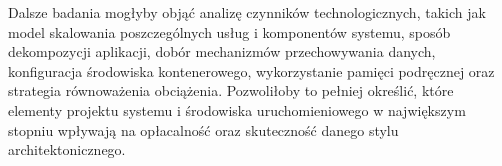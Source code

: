 Dalsze badania mogłyby objąć analizę czynników technologicznych, takich jak model skalowania poszczególnych usług i komponentów systemu, sposób dekompozycji aplikacji, dobór mechanizmów przechowywania danych, konfiguracja środowiska kontenerowego, wykorzystanie pamięci podręcznej oraz strategia równoważenia obciążenia. Pozwoliłoby to pełniej określić, które elementy projektu systemu i środowiska uruchomieniowego w największym stopniu wpływają na opłacalność oraz skuteczność danego stylu architektonicznego.